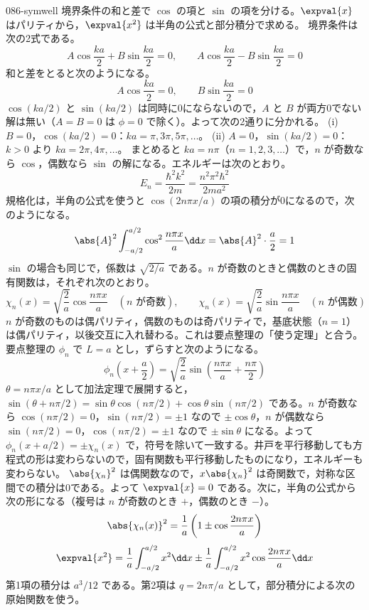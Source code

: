 \documentclass[uplatex,dvipdfmx,a4paper,11pt]{jsarticle}
\begin{document}
\begin{kaisetsu}{086-symwell}
\houshin 境界条件の和と差で $\cos$ の項と $\sin$ の項を分ける。$\expval{x}$ はパリティから，$\expval{x^{2}}$ は半角の公式と部分積分で求める。
\keisan
{} 境界条件は次の2式である。
\[ A\cos\frac{ka}{2}+B\sin\frac{ka}{2}=0,\qquad A\cos\frac{ka}{2}-B\sin\frac{ka}{2}=0 \]
和と差をとると次のようになる。
\[ A\cos\frac{ka}{2}=0,\qquad B\sin\frac{ka}{2}=0 \]
$\cos(ka/2)$ と $\sin(ka/2)$ は同時に0にならないので，$A$ と $B$ が両方0でない解は無い（$A=B=0$ は $\phi=0$ で除く）。よって次の2通りに分かれる。
(i) $B=0$，$\cos(ka/2)=0$：$ka=\pi,3\pi,5\pi,\dots$。
(ii) $A=0$，$\sin(ka/2)=0$：$k>0$ より $ka=2\pi,4\pi,\dots$。
まとめると $ka=n\pi$（$n=1,2,3,\dots$）で，$n$ が奇数なら $\cos$，偶数なら $\sin$ の解になる。エネルギーは次のとおり。
\[ E_{n}=\frac{\hbar^{2}k^{2}}{2m}=\frac{n^{2}\pi^{2}\hbar^{2}}{2ma^{2}} \]
規格化は，半角の公式を使うと $\cos(2n\pi x/a)$ の項の積分が0になるので，次のようになる。
\[ \abs{A}^{2}\int_{-a/2}^{a/2}\cos^{2}\frac{n\pi x}{a}\dd x=\abs{A}^{2}\cdot\frac{a}{2}=1 \]
$\sin$ の場合も同じで，係数は $\sqrt{2/a}$ である。$n$ が奇数のときと偶数のときの固有関数は，それぞれ次のとおり。
\[ \chi_{n}(x)=\sqrt{\frac{2}{a}}\cos\frac{n\pi x}{a}\quad(\text{$n$ が奇数}),\qquad \chi_{n}(x)=\sqrt{\frac{2}{a}}\sin\frac{n\pi x}{a}\quad(\text{$n$ が偶数}) \]
$n$ が奇数のものは偶パリティ，偶数のものは奇パリティで，基底状態（$n=1$）は偶パリティ，以後交互に入れ替わる。これは要点整理の「使う定理」と合う。
 要点整理の $\phi_{n}$ で $L=a$ とし，ずらすと次のようになる。
\[ \phi_{n}\left(x+\frac{a}{2}\right)=\sqrt{\frac{2}{a}}\sin\left(\frac{n\pi x}{a}+\frac{n\pi}{2}\right) \]
$\theta=n\pi x/a$ として加法定理で展開すると，$\sin(\theta+n\pi/2)=\sin\theta\cos(n\pi/2)+\cos\theta\sin(n\pi/2)$ である。$n$ が奇数なら $\cos(n\pi/2)=0$，$\sin(n\pi/2)=\pm 1$ なので $\pm\cos\theta$，$n$ が偶数なら $\sin(n\pi/2)=0$，$\cos(n\pi/2)=\pm 1$ なので $\pm\sin\theta$ になる。よって $\phi_{n}(x+a/2)=\pm\chi_{n}(x)$ で，符号を除いて一致する。井戸を平行移動しても方程式の形は変わらないので，固有関数も平行移動したものになり，エネルギーも変わらない。
 $\abs{\chi_{n}}^{2}$ は偶関数なので，$x\abs{\chi_{n}}^{2}$ は奇関数で，対称な区間での積分は0である。よって $\expval{x}=0$ である。次に，半角の公式から次の形になる（複号は $n$ が奇数のとき $+$，偶数のとき $-$）。
\[ \abs{\chi_{n}(x)}^{2}=\frac{1}{a}\left(1\pm\cos\frac{2n\pi x}{a}\right) \]
\[ \expval{x^{2}}=\frac{1}{a}\int_{-a/2}^{a/2}x^{2}\dd x\pm\frac{1}{a}\int_{-a/2}^{a/2}x^{2}\cos\frac{2n\pi x}{a}\dd x \]
第1項の積分は $a^{3}/12$ である。第2項は $q=2n\pi/a$ として，部分積分による次の原始関数を使う。

\end{kaisetsu}
\end{document}
